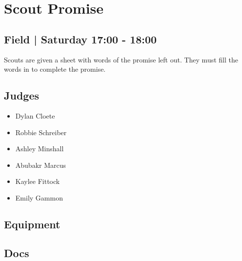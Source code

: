 \documentclass[10pt]{article}
\begin{document}
		\begin{minipage}{\linewidth}
		\setcounter{section}{16}
	\section{Scout Promise }
	\subsection*{Field | Saturday 17:00 - 18:00}

	Scouts are given a sheet with words of the promise left out. They must fill the words in to complete the promise.

	\begin{multicols}{2}
	\subsection*{\faUsers \: Judges}
	\begin{itemize}
			\item Dylan Cloete
			\item Robbie Schreiber
			\item Ashley Minshall
			\item Abubakr Marcus
			\item Kaylee Fittock
			\item Emily Gammon
		\end{itemize}
	\columnbreak
	\subsection*{\faWrench \: Equipment}
	        \vfill\null
        \subsection*{\faFile \: Docs}
     	\end{multicols}


	\vspace{1cm}
	\end{minipage}
\end{document}
